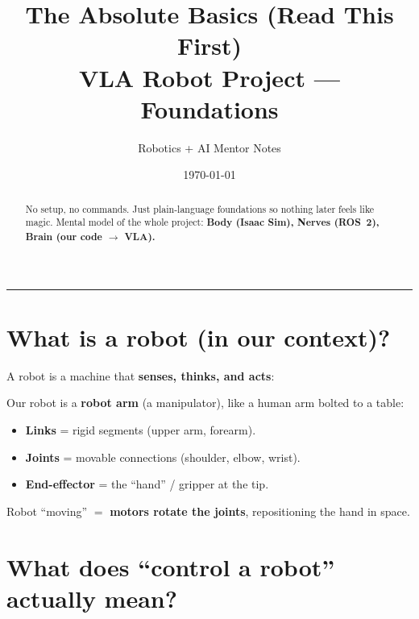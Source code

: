 \documentclass[11pt]{article}
\title{\textbf{The Absolute Basics (Read This First)}\\[4pt]
\large VLA Robot Project --- Foundations}
\author{Robotics + AI Mentor Notes}
\date{\today}
\begin{document}
\maketitle

\begin{abstract}
\noindent No setup, no commands. Just plain-language foundations so nothing later
feels like magic. Mental model of the whole project:
\textbf{Body (Isaac Sim), Nerves (ROS~2), Brain (our code $\rightarrow$ VLA).}
\end{abstract}

\tableofcontents
\bigskip
\hrule

\section{What is a robot (in our context)?}

A robot is a machine that \textbf{senses, thinks, and acts}:

\begin{center}
\end{center}

Our robot is a \textbf{robot arm} (a manipulator), like a human arm bolted to a table:
\begin{itemize}[leftmargin=*]
  \item \textbf{Links} = rigid segments (upper arm, forearm).
  \item \textbf{Joints} = movable connections (shoulder, elbow, wrist).
  \item \textbf{End-effector} = the ``hand'' / gripper at the tip.
\end{itemize}

Robot ``moving'' $=$ \textbf{motors rotate the joints}, repositioning the hand in space.

\section{What does ``control a robot'' actually mean?}
\end{document}

